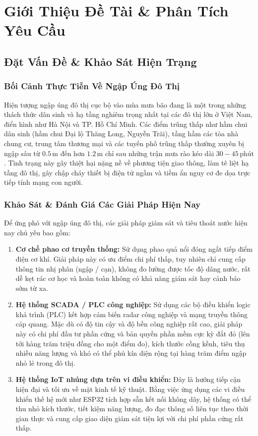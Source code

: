 \chapter{Giới Thiệu Đề Tài \& Phân Tích Yêu Cầu}
\label{ch:introduction}

\section{Đặt Vấn Đề \& Khảo Sát Hiện Trạng}

\subsection{Bối Cảnh Thực Tiễn Về Ngập Úng Đô Thị}
Hiện tượng ngập úng đô thị cục bộ vào mùa mưa bão đang là một trong những thách thức dân sinh và hạ tầng nghiêm trọng nhất tại các đô thị lớn ở Việt Nam, điển hình như Hà Nội và TP. Hồ Chí Minh. Các điểm trũng thấp như hầm chui dân sinh (hầm chui Đại lộ Thăng Long, Nguyễn Trãi), tầng hầm các tòa nhà chung cư, trung tâm thương mại và các tuyến phố trũng thấp thường xuyên bị ngập sâu từ $0.5\,\text{m}$ đến hơn $1.2\,\text{m}$ chỉ sau những trận mưa rào kéo dài $30 - 45\,\text{phút}$. Tình trạng này gây thiệt hại nặng nề về phương tiện giao thông, làm tê liệt hạ tầng đô thị, gây chập cháy thiết bị điện tử ngầm và tiềm ẩn nguy cơ đe dọa trực tiếp tính mạng con người.

\subsection{Khảo Sát \& Đánh Giá Các Giải Pháp Hiện Nay}
Để ứng phó với ngập úng đô thị, các giải pháp giám sát và tiêu thoát nước hiện nay chủ yếu bao gồm:
\begin{enumerate}
    \item \textbf{Cơ chế phao cơ truyền thống:} Sử dụng phao quả nổi đóng ngắt tiếp điểm điện cơ khí. Giải pháp này có ưu điểm chi phí thấp, tuy nhiên chỉ cung cấp thông tin nhị phân (ngập / cạn), không đo lường được tốc độ dâng nước, rất dễ kẹt rác cơ học và hoàn toàn không có khả năng giám sát hay cảnh báo sớm từ xa.
    \item \textbf{Hệ thống SCADA / PLC công nghiệp:} Sử dụng các bộ điều khiển logic khả trình (PLC) kết hợp cảm biến radar công nghiệp và mạng truyền thông cáp quang. Mặc dù có độ tin cậy và độ bền công nghiệp rất cao, giải pháp này có chi phí đầu tư phần cứng và bản quyền phần mềm cực kỳ đắt đỏ (lên tới hàng trăm triệu đồng cho một điểm đo), kích thước cồng kềnh, tiêu thụ nhiều năng lượng và khó có thể phủ kín diện rộng tại hàng trăm điểm ngập nhỏ lẻ trong đô thị.
    \item \textbf{Hệ thống IoT nhúng dựa trên vi điều khiển:} Đây là hướng tiếp cận hiện đại và tối ưu về mặt kinh tế kỹ thuật. Bằng việc ứng dụng các vi điều khiển thế hệ mới như ESP32 tích hợp sẵn kết nối không dây, hệ thống có thể thu nhỏ kích thước, tiết kiệm năng lượng, đo đạc thông số liên tục theo thời gian thực và cung cấp giao diện giám sát tiện lợi với chi phí phần cứng rất thấp.
\end{enumerate}

